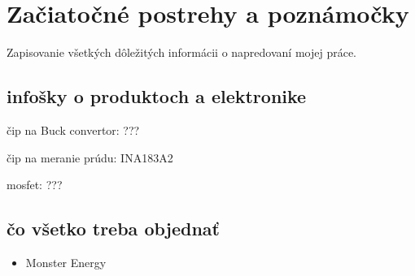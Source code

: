 \chapter{Začiatočné postrehy a poznámočky}
\label{začiatok}


Zapisovanie všetkých dôležitých informácii o napredovaní mojej práce.




\section{infošky o produktoch a elektronike}

čip na Buck convertor: ??? \cite{BUCK2021}

čip na meranie prúdu: INA183A2 \cite{INA2021}

mosfet: ??? \cite{MOSFET2021}


\section{čo všetko treba objednať}

\begin{itemize}
\item Monster Energy
\end{itemize} 